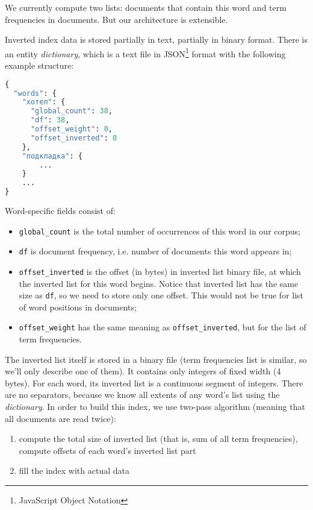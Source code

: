 We currently compute two lists: 
documents that contain this word and term frequencies in documents. 
But our architecture is extensible.

Inverted index data is stored partially in text, partially in binary format. 
There is an entity \textit{dictionary}, which is a text file in JSON\footnote{\label{json}JavaScript Object Notation} format with the following example structure:

\begin{lstlisting}[language=Python]
{
  "words": {
    "хотел": {
      "global_count": 38,
      "df": 38,
      "offset_weight": 0,
      "offset_inverted": 0
    },
    "подкладка": {
        ...
    }
    ...
}
\end{lstlisting}

Word-specific fields consist of:
\begin{itemize}
    \item \texttt{global\_count} is the total number of occurrences of this word in our corpus;
    \item \texttt{df} is document frequency, i.e. number of documents this word appears in;
    \item \texttt{offset\_inverted} is the offset (in bytes) in inverted list binary file, at which the inverted list for this word begins.
    Notice that inverted list has the same size as \texttt{df}, so we need to store only one offset. 
    This would not be true for list of word positions in documents;
    \item \texttt{offset\_weight} has the same meaning as \newline \texttt{offset\_inverted}, but for the list of term frequencies.
\end{itemize}

The inverted list itself is stored in a binary file (term frequencies list is similar, so we'll only describe one of them). 
It contains only integers of fixed width (4 bytes). 
For each word, its inverted list is a continuous segment of integers. 
There are no separators, because we know all extents of any word's list using the \textit{dictionary}. 
In order to build this index, we use two-pass algorithm (meaning that all documents are read twice):
\begin{enumerate}
    \item compute the total size of inverted list (that is, sum of all term frequencies), compute offsets of each word's inverted list part
    \item fill the index with actual data
\end{enumerate}

